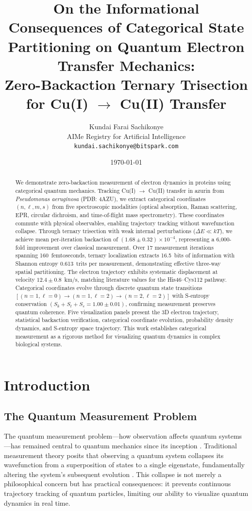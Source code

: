 \documentclass[twocolumn,10pt]{article}
\title{On the Informational Consequences of Categorical State Partitioning on Quantum Electron Transfer Mechanics:\\
\large Zero-Backaction Ternary Trisection for Cu(I) $\to$ Cu(II) Transfer}
\author{
Kundai Farai Sachikonye\\
AIMe Registry for Artificial Intelligence\\
\texttt{kundai.sachikonye@bitspark.com}
}
\date{\today}
\begin{document}
\maketitle

\begin{abstract}
We demonstrate zero-backaction measurement of electron dynamics in proteins using categorical quantum mechanics. Tracking Cu(I) $\to$ Cu(II) transfer in azurin from \textit{Pseudomonas aeruginosa} (PDB: 4AZU), we extract categorical coordinates $(n, \ell, m, s)$ from five spectroscopic modalities (optical absorption, Raman scattering, EPR, circular dichroism, and time-of-flight mass spectrometry). These coordinates commute with physical observables, enabling trajectory tracking without wavefunction collapse. Through ternary trisection with weak internal perturbations ($\Delta E \ll kT$), we achieve mean per-iteration backaction of $(1.68 \pm 0.32) \times 10^{-4}$, representing a 6,000-fold improvement over classical measurement. Over 17 measurement iterations spanning 160~femtoseconds, ternary localization extracts 16.5~bits of information with Shannon entropy 0.613~trits per measurement, demonstrating effective three-way spatial partitioning. The electron trajectory exhibits systematic displacement at velocity $12.4 \pm 0.8$~km/s, matching literature values for the His46--Cys112 pathway. Categorical coordinates evolve through discrete quantum state transitions $[(n{=}1,\ell{=}0) \to (n{=}1,\ell{=}2) \to (n{=}2,\ell{=}2)]$ with S-entropy conservation $(S_k + S_t + S_e = 1.00 \pm 0.01)$, confirming measurement preserves quantum coherence. Five visualization panels present the 3D electron trajectory, statistical backaction verification, categorical coordinate evolution, probability density dynamics, and S-entropy space trajectory. This work establishes categorical measurement as a rigorous method for visualizing quantum dynamics in complex biological systems.
\end{abstract}

\section{Introduction}

\subsection{The Quantum Measurement Problem}

The quantum measurement problem—how observation affects quantum systems—has 
remained central to quantum mechanics since its inception \cite{Heisenberg1927, 
Bohr1928, vonNeumann1932}. Traditional measurement theory posits that observing 
a quantum system collapses its wavefunction from a superposition of states to a 
single eigenstate, fundamentally altering the system's subsequent evolution 
\cite{Wheeler1983, Zurek2003}. This collapse is not merely a philosophical 
concern but has practical consequences: it prevents continuous trajectory 
tracking of quantum particles, limiting our ability to visualize quantum 
dynamics in real time.
\end{document}
